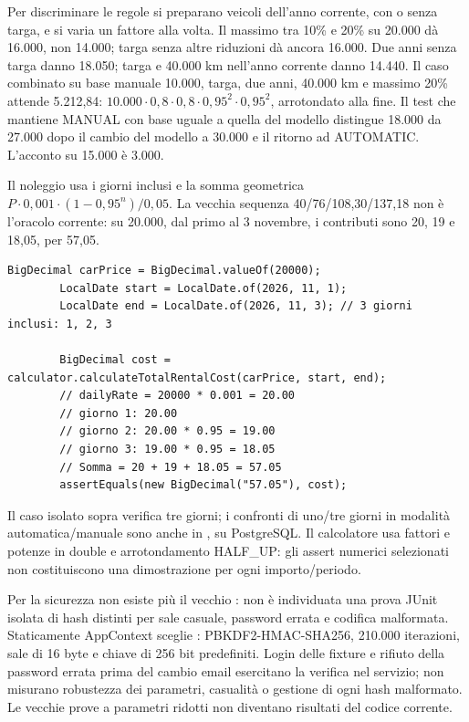 Per discriminare le regole si preparano veicoli dell'anno corrente,
con o senza targa, e si varia un fattore alla volta. Il massimo tra 10\%
e 20\% su 20.000 dà 16.000, non 14.000; targa senza altre riduzioni dà
ancora 16.000. Due anni senza targa danno 18.050; targa e 40.000 km
nell'anno corrente danno 14.440. Il caso combinato su base manuale
10.000, targa, due anni, 40.000 km e massimo 20\% attende 5.212,84:
$10.000\cdot0,8\cdot0,8\cdot0,95^2\cdot0,95^2$, arrotondato alla fine.
Il test che mantiene MANUAL con base uguale a quella del modello distingue
18.000 da 27.000 dopo il cambio del modello a 30.000 e il ritorno ad
AUTOMATIC. L'acconto su 15.000 è 3.000.

Il noleggio usa i giorni inclusi e la somma geometrica
$P\cdot0,001\cdot(1-0,95^n)/0,05$. La vecchia sequenza
40/76/108,30/137,18 non è l'oracolo corrente: su 20.000, dal primo al
3 novembre, i contributi sono 20, 19 e 18,05, per 57,05.

\noindent\begin{minipage}{\linewidth}
\begin{lstlisting}[firstnumber=156,caption={Formula di noleggio: preparazione, chiamata e assert corrente.},label=lst:test-pricing]
        BigDecimal carPrice = BigDecimal.valueOf(20000);
        LocalDate start = LocalDate.of(2026, 11, 1);
        LocalDate end = LocalDate.of(2026, 11, 3); // 3 giorni inclusi: 1, 2, 3

        BigDecimal cost = calculator.calculateTotalRentalCost(carPrice, start, end);
        // dailyRate = 20000 * 0.001 = 20.00
        // giorno 1: 20.00
        // giorno 2: 20.00 * 0.95 = 19.00
        // giorno 3: 19.00 * 0.95 = 18.05
        // Somma = 20 + 19 + 18.05 = 57.05
        assertEquals(new BigDecimal("57.05"), cost);
\end{lstlisting}
\end{minipage}


Il caso isolato sopra verifica tre giorni; i confronti di uno/tre giorni
in modalità automatica/manuale sono anche in
, su PostgreSQL. Il calcolatore usa
fattori e potenze in double e arrotondamento HALF\_UP: gli assert numerici
selezionati non costituiscono una dimostrazione per ogni importo/periodo.

Per la sicurezza non esiste più il vecchio :
non è individuata una prova JUnit isolata di hash distinti per sale casuale,
password errata e codifica malformata. Staticamente AppContext sceglie
: PBKDF2-HMAC-SHA256, 210.000 iterazioni,
sale di 16 byte e chiave di 256 bit predefiniti. Login delle fixture e
rifiuto della password errata prima del cambio email esercitano la verifica
nel servizio; non misurano robustezza dei parametri, casualità o gestione
di ogni hash malformato. Le vecchie prove a parametri ridotti non diventano
risultati del codice corrente.

